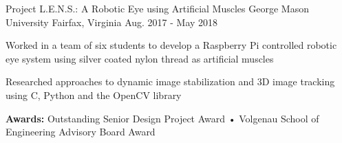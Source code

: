 


\begin{cventries}


\cventry
{Project L.E.N.S.: A Robotic Eye using Artificial Muscles} %
{George Mason University} %
{Fairfax, Virginia} %
{Aug. 2017 - May 2018} %
{ %
\begin{cvitems}
\item {Worked in a team of six students to develop a Raspberry Pi controlled robotic eye system using silver coated nylon thread as artificial muscles}
\item {Researched approaches to dynamic image stabilization and 3D image tracking using C, Python and the OpenCV library}
\item {\textbf{Awards:} Outstanding Senior Design Project Award • Volgenau School of Engineering Advisory Board Award}
\end{cvitems}
}




\end{cventries}
